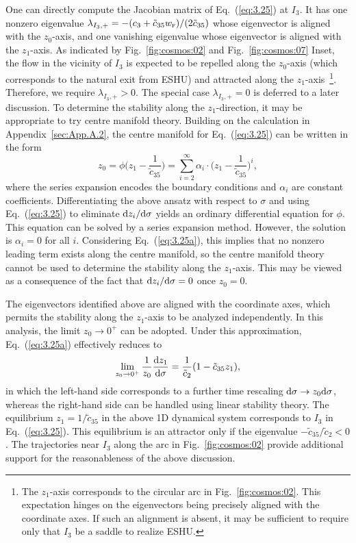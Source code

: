 \documentclass[aps,prd,twocolumn]{revtex4-2}
\newcommand\dx{{\rm d}}
\newcommand\subF{\textsc{f}}
\begin{document}
One can directly compute the Jacobian matrix of Eq.~(\ref{eq:3.25}) at $I_3$. It has one nonzero eigenvalue $\lambda_{I_3,+}=-(c_3+\tilde{c}_{35}w_\subF)/(2\tilde{c}_{35})$ whose eigenvector is aligned with the $z_0$-axis, and one vanishing eigenvalue whose eigenvector is aligned with the $z_1$-axis. As indicated by Fig.~\ref{fig:cosmos:02} and Fig.~\ref{fig:cosmos:07} Inset, the flow in the vicinity of $I_3$ is expected to be repelled along the $z_0$-axis (which corresponds to the natural exit from ESHU) and attracted along the $z_1$-axis~\footnote{The $z_1$-axis corresponds to the circular arc in Fig.~\ref{fig:cosmos:02}. This expectation hinges on the eigenvectors being precisely aligned with the coordinate axes. If such an alignment is absent, it may be sufficient to require only that $I_3$ be a saddle to realize ESHU.}. Therefore, we require $\lambda_{I_3,+}>0$. The special case $\lambda_{I_3,+}=0$ is deferred to a later discussion. To determine the stability along the $z_1$-direction, it may be appropriate to try centre manifold theory. Building on the calculation in Appendix~\ref{sec:App.A.2}, the centre manifold for Eq.~(\ref{eq:3.25}) can be written in the form
\begin{equation}\label{eq:3.26}
  z_0 = \phi\big(z_1-\frac{1}{\tilde{c}_{35}}\big)
  = \sum_{i=2}^{\infty} \alpha_i \cdot \big(z_1-\frac{1}{\tilde{c}_{35}}\big)^i,
\end{equation}
where the series expansion encodes the boundary conditions and $\alpha_i$ are constant coefficients. Differentiating the above ansatz with respect to $\sigma$ and using Eq.~(\ref{eq:3.25}) to eliminate $\dx z_i/\dx\sigma$ yields an ordinary differential equation for $\phi$. This equation can be solved by a series expansion method. However, the solution is $\alpha_i=0$ for all $i$. Considering Eq.~(\ref{eq:3.25a}), this implies that no nonzero leading term exists along the centre manifold, so the centre manifold theory cannot be used to determine the stability along the $z_1$-axis. This may be viewed as a consequence of the fact that $\dx z_i/\dx\sigma=0$ once $z_0=0$.

The eigenvectors identified above are aligned with the coordinate axes, which permits the stability along the $z_1$-axis to be analyzed independently. In this analysis, the limit $z_0\rightarrow0^{+}$ can be adopted. Under this approximation, Eq.~(\ref{eq:3.25a}) effectively reduces to
\begin{equation}
  \lim_{z_0\rightarrow0^+}\frac{1}{z_0}\frac{\dx z_1}{\dx\sigma} = \frac{1}{\tilde{c}_2}(1 - \tilde{c}_{35}z_1),
\end{equation}
in which the left-hand side corresponds to a further time rescaling $\dx\sigma\rightarrow z_0\dx\sigma$, whereas the right-hand side can be handled using linear stability theory. The equilibrium $z_1=1/\tilde{c}_{35}$ in the above 1D dynamical system corresponds to $I_3$ in Eq.~(\ref{eq:3.25}). This equilibrium is an attractor only if the eigenvalue $-\tilde{c}_{35}/\tilde{c}_2<0$. The trajectories near $I_3$ along the arc in Fig.~\ref{fig:cosmos:02} provide additional support for the reasonableness of the above discussion.
\end{document}
